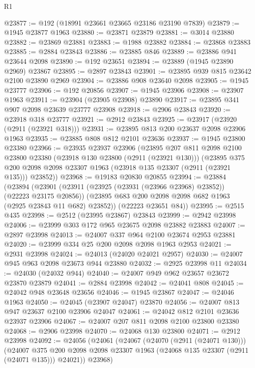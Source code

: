 \begin{lexlean}{R1}
\begin{coremodule}
@23877 := @192 (@18991 @23661 @23665 @23186 @23190 @7839)
@23879 := @1945 @23877 @1963
@23880 := @23871 @23879
@23881 := @3014 @23880
@23882 := @23869 @23881
@23883 := @1988 @23882
@23884 := @23868 @23883
@23885 := @2884 @23843
@23886 := @23885 @846
@23889 := @23886 @941 @23644 @2098
@23890 := @192 @23651
@23894 := @23889 (@1945 @23890 @2969) @23867
@23895 := @2897 @23843
@23901 := @23895 @939 @815 @23642 @2100 @23890 @2969
@23904 := @23886 @908 @23640 @2098
@23905 := @1945 @23777
@23906 := @192 @20856
@23907 := @1945 @23906
@23908 := @23907 @1963
@23911 := @23904 (@23905 @23908) @23890
@23917 := @23895 @341 @907 @2098 @23639 @23777 @23908
@23918 := @2906 @23843
@23920 := @23918 @318 @23777
@23921 := @2912 @23843
@23925 := @23917 (@23920 (@2911 (@23921 @318)))
@23931 := @23895 @813 @200 @23637 @2098 @23906 @1963
@23935 := @23885 @808 @812 @2101 @23636
@23937 := @1945 @23800 @23380
@23966 := @23935
    @23937
    @23906
    (@23895
      @207
      @811
      @2098
      @2100
      @23800
      @23380
      (@23918 @130 @23800 (@2911 (@23921 @130)))
      (@23895 @375 @200 @2098 @2098 @23307 @1963 (@23918 @135 @23307 (@2911 (@23921 @135))) @23852))
@23968 := @19183 @20830 @20855
@23994 := @23884
    (@23894
      (@23901
        (@23911 (@23925 (@23931 (@23966 @23968) @23852)) (@22223 @23175 @20856))
        (@23895 @683 @200 @2098 @2098 @682 @1963 (@2925 @23843 @11 @682) @23852))
      (@22223 @23651 @84))
@23995 := @2515 @435
@23998 := @2512 (@23995 @23867) @23843
@23999 := @2942 @23998
@24006 := @23999 @303 @172 @965 @23675 @2098 @23882 @23883
@24007 := @2897 @23998
@24013 := @24007 @337 @964 @2100 @23674 @2953 @23881
@24020 := @23999 @334 @25 @200 @2098 @2098 @1963 @2953
@24021 := @2931 @23998
@24024 := @24013 (@24020 @24021 @2957)
@24030 := @24007 @945 @963 @2098 @23673 @944 @23880
@24032 := @2925 @23998 @11
@24034 := @24030 (@24032 @944)
@24040 := @24007 @949 @962 @23657 @23672 @23870 @23879
@24041 := @2884 @23998
@24042 := @24041 @808
@24045 := @24042 @948 @23648 @23656
@24046 := @1945 @23867
@24047 := @24046 @1963
@24050 := @24045 (@23907 @24047) @23870
@24056 := @24007 @813 @947 @23637 @2100 @23906 @24047
@24061 := @24042 @812 @2101 @23636 @23937 @23906
@24067 := @24007 @207 @811 @2098 @2100 @23800 @23380
@24068 := @2906 @23998
@24070 := @24068 @130 @23800
@24071 := @2912 @23998
@24092 := @24056
    (@24061
      (@24067
        (@24070 (@2911 (@24071 @130)))
        (@24007
          @375
          @200
          @2098
          @2098
          @23307
          @1963
          (@24068 @135 @23307 (@2911 (@24071 @135)))
          @24021))
      @23968)

\end{coremodule}
\end{lexlean}
